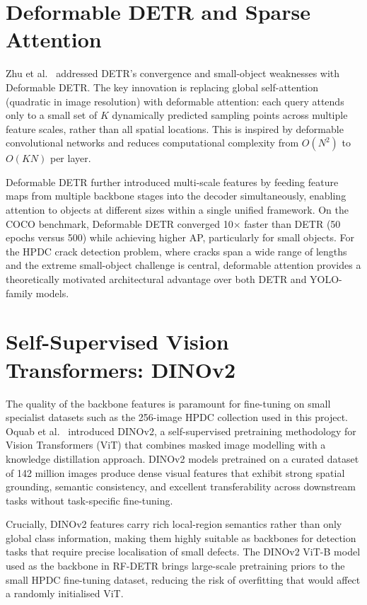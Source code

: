 \section{Deformable DETR and Sparse Attention}

Zhu et al.\ \cite{zhu2020} addressed DETR's convergence and small-object weaknesses with Deformable DETR. The key innovation is replacing global self-attention (quadratic in image resolution) with deformable attention: each query attends only to a small set of $K$ dynamically predicted sampling points across multiple feature scales, rather than all spatial locations. This is inspired by deformable convolutional networks and reduces computational complexity from $O(N^2)$ to $O(KN)$ per layer.

Deformable DETR further introduced multi-scale features by feeding feature maps from multiple backbone stages into the decoder simultaneously, enabling attention to objects at different sizes within a single unified framework. On the COCO benchmark, Deformable DETR converged 10$\times$ faster than DETR (50 epochs versus 500) while achieving higher AP, particularly for small objects. For the HPDC crack detection problem, where cracks span a wide range of lengths and the extreme small-object challenge is central, deformable attention provides a theoretically motivated architectural advantage over both DETR and YOLO-family models.

\section{Self-Supervised Vision Transformers: DINOv2}

The quality of the backbone features is paramount for fine-tuning on small specialist datasets such as the 256-image HPDC collection used in this project. Oquab et al.\ \cite{oquab2023} introduced DINOv2, a self-supervised pretraining methodology for Vision Transformers (ViT) that combines masked image modelling with a knowledge distillation approach. DINOv2 models pretrained on a curated dataset of 142 million images produce dense visual features that exhibit strong spatial grounding, semantic consistency, and excellent transferability across downstream tasks without task-specific fine-tuning.

Crucially, DINOv2 features carry rich local-region semantics rather than only global class information, making them highly suitable as backbones for detection tasks that require precise localisation of small defects. The DINOv2 ViT-B model used as the backbone in RF-DETR brings large-scale pretraining priors to the small HPDC fine-tuning dataset, reducing the risk of overfitting that would affect a randomly initialised ViT.


